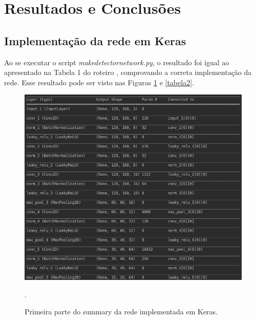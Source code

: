 \documentclass[conference]{IEEEtran}
\begin{document}
\section{Resultados e Conclusões}

\subsection{Implementação da rede em Keras}
Ao se executar o script \textit{make\underline{\space}detector\underline{\space}network.py}, o resultado foi igual ao apresentado na Tabela 1 do roteiro \cite{roteiro}, comprovando a correta implementação da rede. Esse resultado pode ser visto nas Figuras \ref{tabela1} e \ref{tabela2}.

\begin{figure}[htbp]
\centering
\centerline{\includegraphics[scale=0.35]{imagens/tabela1.png}}
\caption{Primeira parte do summary da rede implementada em Keras.}.
\label{tabela1}
\end{figure}
\end{document}
